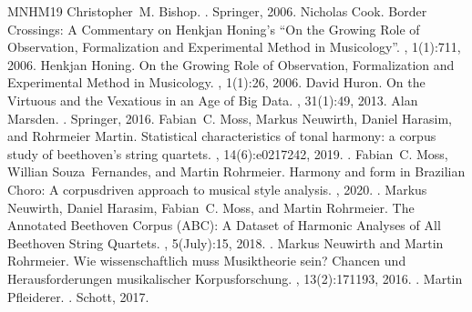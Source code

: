 \documentclass[letterpaper,10pt,english]{sphinxmanual}
\begin{document}
\begin{sphinxthebibliography}{MNHM19}
Christopher M. Bishop. . Springer, 2006.
Nicholas Cook. Border Crossings: A Commentary on Henkjan Honing’s “On the Growing Role of Observation, Formalization and Experimental Method in Musicology”. , 1(1):7\textendash{}11, 2006.
Henkjan Honing. On the Growing Role of Observation, Formalization and Experimental Method in Musicology. , 1(1):2\textendash{}6, 2006.
David Huron. On the Virtuous and the Vexatious in an Age of Big Data. , 31(1):4\textendash{}9, 2013.
Alan Marsden. . Springer, 2016.
Fabian C. Moss, Markus Neuwirth, Daniel Harasim, and Rohrmeier Martin. Statistical characteristics of tonal harmony: a corpus study of beethoven’s string quartets. , 14(6):e0217242, 2019. .
Fabian C. Moss, Willian Souza Fernandes, and Martin Rohrmeier. Harmony and form in Brazilian Choro: A corpus\sphinxhyphen{}driven approach to musical style analysis. , 2020. .
Markus Neuwirth, Daniel Harasim, Fabian C. Moss, and Martin Rohrmeier. The Annotated Beethoven Corpus (ABC): A Dataset of Harmonic Analyses of All Beethoven String Quartets. , 5(July):1\textendash{}5, 2018. .
Markus Neuwirth and Martin Rohrmeier. Wie wissenschaftlich muss Musiktheorie sein? Chancen und Herausforderungen musikalischer Korpusforschung. , 13(2):171\textendash{}193, 2016. .
Martin Pfleiderer. . Schott, 2017.

\end{sphinxthebibliography}
\end{document}
